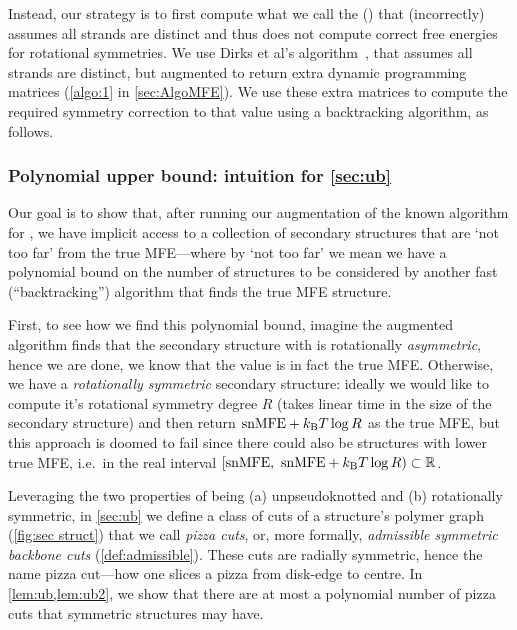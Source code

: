 Instead, our strategy is to first compute what we call the {\em \symnMFE} (\snMFE) that (incorrectly) assumes all strands are distinct and thus does not compute correct free energies for rotational symmetries. 
We use  Dirks et al's \snMFE algorithm~\cite{dirks2007thermodynamic},  that assumes all strands are distinct, but  augmented to return extra dynamic programming matrices (\cref{algo:1} in \cref{sec:AlgoMFE}). 
We use these extra matrices to compute the required symmetry correction to that \snMFE value using a backtracking algorithm, as  follows.



\subsubsection{Polynomial upper bound: intuition for \cref{sec:ub}} 
Our goal is to show that, after running our augmentation of the known algorithm for \snMFE, we have implicit access to a collection of secondary structures that are `not too far' from the true MFE---where by `not too far' we mean we have a polynomial bound on the number of structures to be  considered by another fast (``backtracking'') algorithm that finds the true MFE structure.


First, 
to see how we find this polynomial bound,  imagine  the augmented
\snMFE algorithm finds that the secondary structure with \snMFE is  rotationally {\em  asymmetric}, hence we are done, we know that the \snMFE value is in fact the true MFE. 
Otherwise, we have a {\em rotationally symmetric} secondary structure: ideally we would like to compute it's rotational symmetry degree $R$ (takes linear time in the size of the secondary structure) and then return  $\mathrm{snMFE} + k_\mathrm{B} T \log R$ as the true MFE, but this approach is doomed to fail since there could also be structures with lower true MFE, i.e.~in the real interval $[\mathrm{snMFE}, \ \mathrm{snMFE} + k_\mathrm{B} T \log R) \subset \mathbb{R}$. 



Leveraging the two properties of being (a) unpseudoknotted and (b) rotationally symmetric, in \cref{sec:ub} we define a class of cuts of a structure's polymer graph (\cref{fig:sec struct}) that we call {\em pizza cuts}, or, more formally, \emph{admissible symmetric backbone cuts} (\cref{def:admissible}). 
These cuts are radially symmetric, hence the name pizza cut---how one slices a pizza from disk-edge to centre.
In \cref{lem:ub,lem:ub2}, we show that there are at most a polynomial number of pizza cuts that symmetric structures may have. 



